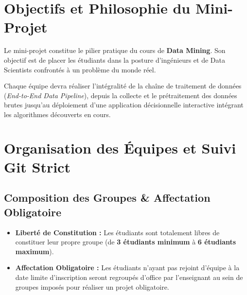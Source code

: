 \documentclass[11pt,a4paper]{article}
\begin{document}
\section{Objectifs et Philosophie du Mini-Projet}

Le mini-projet constitue le pilier pratique du cours de \textbf{Data Mining}. Son objectif est de placer les étudiants dans la posture d'ingénieurs et de Data Scientists confrontés à un problème du monde réel. 

Chaque équipe devra réaliser l'intégralité de la chaîne de traitement de données (\textit{End-to-End Data Pipeline}), depuis la collecte et le prétraitement des données brutes jusqu'au déploiement d'une application décisionnelle interactive intégrant les algorithmes découverts en cours.

\section{Organisation des Équipes et Suivi Git Strict}

\subsection{Composition des Groupes \& Affectation Obligatoire}
\begin{itemize}
    \item \textbf{Liberté de Constitution :} Les étudiants sont totalement libres de constituer leur propre groupe (de \textbf{3 étudiants minimum} à \textbf{6 étudiants maximum}).
    \item \textbf{Affectation Obligatoire :} Les étudiants n'ayant pas rejoint d'équipe à la date limite d'inscription seront regroupés d'office par l'enseignant au sein de groupes imposés pour réaliser un projet obligatoire.
\end{itemize}
\end{document}

